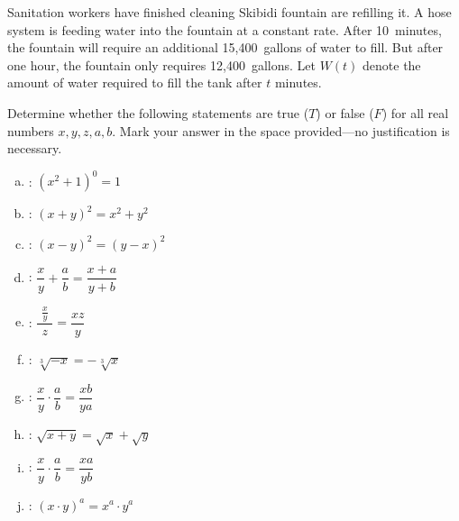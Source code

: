 \documentclass[12pt,letterpaper]{exam}
\begin{document}
\begin{questions}
\newpage
\question Sanitation workers have finished cleaning Skibidi fountain are refilling it. A hose system is feeding water into the fountain at a constant rate. After 10~minutes, the fountain will require an additional 15,400~gallons of water to fill. But after one hour, the fountain only requires 12,400~gallons. Let $W(t)$ denote the amount of water required to fill the tank after $t$ minutes. 



\newpage
\question[10] Determine whether the following statements are true ($T$) or false ($F$) for all real numbers $x, y, z, a, b$. Mark your answer in the space provided---no justification is necessary. \pvspace{0.5cm}
	\begin{enumerate}[(a)]
	\item {}: $(x^2 + 1)^0= 1$ \vfill
	\item {}: $(x + y)^2= x^2 + y^2$ \vfill
	\item {}: $(x - y)^2= (y - x)^2$ \vfill
	\item {}: $\dfrac{x}{y} + \dfrac{a}{b}= \dfrac{x + a}{y + b}$ \vfill
	\item {}: $\dfrac{\,\,\frac{x}{y}\,\,}{z}= \dfrac{xz}{y}$ \vfill
	\item {}: $\sqrt[3]{-x}= -\sqrt[3]{x}$ \vfill
	\item {}: $\dfrac{x}{y} \cdot \dfrac{a}{b}= \dfrac{xb}{ya}$ \vfill
	\item {}: $\sqrt{x + y}= \sqrt{x} + \sqrt{y}$ \vfill
	\item {}: $\dfrac{x}{y} \cdot \dfrac{a}{b}= \dfrac{xa}{yb}$ \vfill
	\item {}: $(x \cdot y)^a= x^a \cdot y^a$
	\end{enumerate}

\end{questions}
\end{document}
